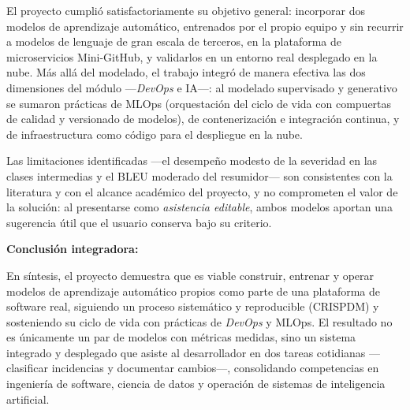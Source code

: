 El proyecto cumplió satisfactoriamente su objetivo general: incorporar dos modelos de aprendizaje automático, entrenados por el propio equipo y sin recurrir a modelos de lenguaje de gran escala de terceros, en la plataforma de microservicios Mini-GitHub, y validarlos en un entorno real desplegado en la nube. Más allá del modelado, el trabajo integró de manera efectiva las dos dimensiones del módulo —\textit{DevOps} e \acrfull{IA}—: al modelado supervisado y generativo se sumaron prácticas de \acrshort{MLOps} (orquestación del ciclo de vida con compuertas de calidad y versionado de modelos), de contenerización e integración continua, y de infraestructura como código para el despliegue en la nube.

Las limitaciones identificadas —el desempeño modesto de la severidad en las clases intermedias y el \acrshort{BLEU} moderado del resumidor— son consistentes con la literatura y con el alcance académico del proyecto, y no comprometen el valor de la solución: al presentarse como \textit{asistencia editable}, ambos modelos aportan una sugerencia útil que el usuario conserva bajo su criterio.

\vspace{0.5em}

\textbf{Conclusión integradora:}

\vspace{0.3em}

En síntesis, el proyecto demuestra que es viable construir, entrenar y operar modelos de aprendizaje automático propios como parte de una plataforma de software real, siguiendo un proceso sistemático y reproducible (\acrshort{CRISPDM}) y sosteniendo su ciclo de vida con prácticas de \textit{DevOps} y \acrshort{MLOps}. El resultado no es únicamente un par de modelos con métricas medidas, sino un sistema integrado y desplegado que asiste al desarrollador en dos tareas cotidianas —clasificar incidencias y documentar cambios—, consolidando competencias en ingeniería de software, ciencia de datos y operación de sistemas de inteligencia artificial.
